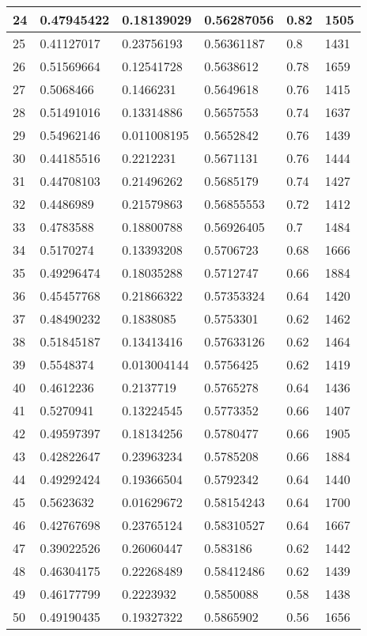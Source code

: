 \begin{longtable}{|l|l|l|l|l|l|}
24 & 0.47945422 & 0.18139029 & 0.56287056 & 0.82 & 1505 \\ \hline 
25 & 0.41127017 & 0.23756193 & 0.56361187 & 0.8 & 1431 \\ \hline 
26 & 0.51569664 & 0.12541728 & 0.5638612 & 0.78 & 1659 \\ \hline 
27 & 0.5068466 & 0.1466231 & 0.5649618 & 0.76 & 1415 \\ \hline 
28 & 0.51491016 & 0.13314886 & 0.5657553 & 0.74 & 1637 \\ \hline 
29 & 0.54962146 & 0.011008195 & 0.5652842 & 0.76 & 1439 \\ \hline 
30 & 0.44185516 & 0.2212231 & 0.5671131 & 0.76 & 1444 \\ \hline 
31 & 0.44708103 & 0.21496262 & 0.5685179 & 0.74 & 1427 \\ \hline 
32 & 0.4486989 & 0.21579863 & 0.56855553 & 0.72 & 1412 \\ \hline 
33 & 0.4783588 & 0.18800788 & 0.56926405 & 0.7 & 1484 \\ \hline 
34 & 0.5170274 & 0.13393208 & 0.5706723 & 0.68 & 1666 \\ \hline 
35 & 0.49296474 & 0.18035288 & 0.5712747 & 0.66 & 1884 \\ \hline 
36 & 0.45457768 & 0.21866322 & 0.57353324 & 0.64 & 1420 \\ \hline 
37 & 0.48490232 & 0.1838085 & 0.5753301 & 0.62 & 1462 \\ \hline 
38 & 0.51845187 & 0.13413416 & 0.57633126 & 0.62 & 1464 \\ \hline 
39 & 0.5548374 & 0.013004144 & 0.5756425 & 0.62 & 1419 \\ \hline 
40 & 0.4612236 & 0.2137719 & 0.5765278 & 0.64 & 1436 \\ \hline 
41 & 0.5270941 & 0.13224545 & 0.5773352 & 0.66 & 1407 \\ \hline 
42 & 0.49597397 & 0.18134256 & 0.5780477 & 0.66 & 1905 \\ \hline 
43 & 0.42822647 & 0.23963234 & 0.5785208 & 0.66 & 1884 \\ \hline 
44 & 0.49292424 & 0.19366504 & 0.5792342 & 0.64 & 1440 \\ \hline 
45 & 0.5623632 & 0.01629672 & 0.58154243 & 0.64 & 1700 \\ \hline 
46 & 0.42767698 & 0.23765124 & 0.58310527 & 0.64 & 1667 \\ \hline 
47 & 0.39022526 & 0.26060447 & 0.583186 & 0.62 & 1442 \\ \hline 
48 & 0.46304175 & 0.22268489 & 0.58412486 & 0.62 & 1439 \\ \hline 
49 & 0.46177799 & 0.2223932 & 0.5850088 & 0.58 & 1438 \\ \hline 
50 & 0.49190435 & 0.19327322 & 0.5865902 & 0.56 & 1656 \\ \hline 
\end{longtable}